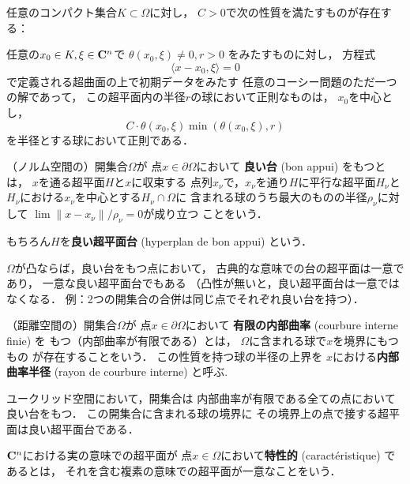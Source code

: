 \begin{THM*}
    任意のコンパクト集合\(K\subset\Omega\)に対し，
    \(C>0\)で次の性質を満たすものが存在する：
    
    任意の\(x_0\in K,\xi\in\mathbf{C}^n\)で
    \(\theta(x_0,\xi)\ne0, r>0\)
    をみたすものに対し，
    方程式
    \[
        \langle x-x_0,\xi\rangle=0
    \]で定義される超曲面の上で初期データをみたす
    任意のコーシー問題のただ一つの解であって，
    この超平面内の半径\(r\)の球において正則なものは，
    \(x_0\)を中心とし，
    \[
        C\cdot\theta(x_0,\xi)\min\left(\theta(x_0,\xi),r\right)
    \]
    を半径とする球において正則である．
\end{THM*}

\begin{DFN}
    （ノルム空間の）開集合\(\Omega\)が
    点\(x\in\partial\Omega\)において
    \textbf{良い台} (bon appui) をもつとは，
    \(x\)を通る超平面\(H\)と\(x\)に収束する
    点列\(x_\nu\)で，\(x_\nu\)を通り\(H\)に平行な超平面\(H_\nu\)と
    \(H_\nu\)における\(x_\nu\)を中心とする\(H_\nu\cap\Omega\)に
    含まれる球のうち最大のものの半径\(\rho_\nu\)に対して
    \(\lim\lVert x-x_\nu\rVert/\rho_\nu=0\)が成り立つ
    ことをいう．

    もちろん\(H\)を\textbf{良い超平面台} 
    (hyperplan de bon appui) という．
\end{DFN}
\begin{CMT}
    \(\Omega\)が凸ならば，良い台をもつ点において，
    古典的な意味での台の超平面は一意であり，
    一意な良い超平面台でもある
    （凸性が無いと，良い超平面台は一意ではなくなる．
    例：2つの開集合の合併は同じ点でそれぞれ良い台を持つ）．
\end{CMT}
\begin{DFN}
    （距離空間の）開集合\(\Omega\)が
    点\(x\in\partial\Omega\)において
    \textbf{有限の内部曲率} (courbure interne finie) を
    もつ（内部曲率が有限である）とは，
    \(\Omega\)に含まれる球で\(x\)を境界にもつもの
    が存在することをいう．
    この性質を持つ球の半径の上界を
    \(x\)における\textbf{内部曲率半径} 
    (rayon de courbure interne) と呼ぶ.
\end{DFN}
\begin{CMT}
    ユークリッド空間において，開集合は
    内部曲率が有限である全ての点において良い台をもつ．
    この開集合に含まれる球の境界に
    その境界上の点で接する超平面は良い超平面台である．
\end{CMT}
\begin{DFN}
    \(\mathbf{C}^n\)における実の意味での超平面が
    点\(x\in\Omega\)において\textbf{特性的} 
    (caract\'eristique) であるとは，
    それを含む複素の意味での超平面が一意なことをいう．
\end{DFN}
